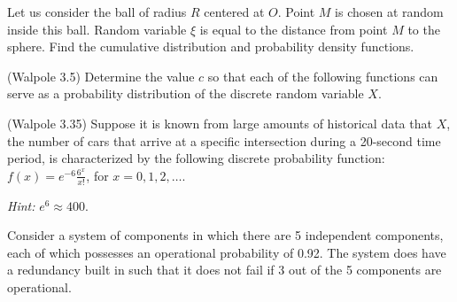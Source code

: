 \documentclass[14pt]{exam}
\begin{document}
\begin{questions}
		
		\question
		Let us consider the ball of radius $R$ centered at $O$. Point $M$ is chosen at random inside this ball. Random variable $\xi$ is equal to the distance from point $M$ to the sphere. Find the cumulative distribution and probability density functions.
		
		
		
		
		
		\question
		(Walpole 3.5) Determine the value $c$ so that each of the following functions can serve as a probability distribution of the discrete random variable $X$.
		
		




		
		\question
		(Walpole 3.35) Suppose it is known from large amounts of historical data that $X$, the number of cars that arrive at a specific intersection during a 20-second time period, is characterized by the following discrete probability function: $f(x) = e^{-6}\frac{6^x}{x!}$, for $x = 0, 1, 2, \dots$.
		
		
		\textit{Hint:} $e^6 \approx 400$.
		



		
		
		\question
		Consider a system of components in which there are 5 independent components, each of which possesses an operational probability of 0.92. The system does have a redundancy built in such that it does not fail if 3 out of the 5 components are operational.
		

\end{questions}
\end{document}
